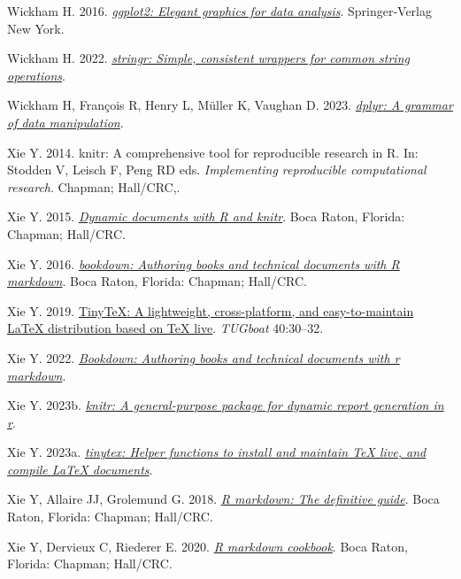 \documentclass[10pt,a4paper]{article}
\newlength{\cslhangindent}
\newenvironment{CSLReferences}[2] %
 {\begin{list}{}{%
  \setlength{\itemindent}{0pt}
  \setlength{\leftmargin}{0pt}
  \setlength{\parsep}{0pt}
  \ifodd #1
   \setlength{\leftmargin}{\cslhangindent}
   \setlength{\itemindent}{-1\cslhangindent}
  \fi
  \setlength{\itemsep}{#2\baselineskip}}}
 {\end{list}}
\begin{document}
\begin{CSLReferences}{1}{0}
Wickham H. 2016. \emph{\href{https://ggplot2.tidyverse.org}{ggplot2: Elegant graphics for data analysis}}. Springer-Verlag New York.

Wickham H. 2022. \emph{\href{https://CRAN.R-project.org/package=stringr}{{stringr}: Simple, consistent wrappers for common string operations}}.

Wickham H, François R, Henry L, Müller K, Vaughan D. 2023. \emph{\href{https://CRAN.R-project.org/package=dplyr}{{dplyr}: A grammar of data manipulation}}.

Xie Y. 2014. {knitr}: A comprehensive tool for reproducible research in {R}. In: Stodden V, Leisch F, Peng RD eds. \emph{Implementing reproducible computational research}. Chapman; Hall/CRC,.

Xie Y. 2015. \emph{\href{https://yihui.org/knitr/}{Dynamic documents with {R} and knitr}}. Boca Raton, Florida: Chapman; Hall/CRC.

Xie Y. 2016. \emph{\href{https://bookdown.org/yihui/bookdown}{{bookdown}: Authoring books and technical documents with {R} markdown}}. Boca Raton, Florida: Chapman; Hall/CRC.

Xie Y. 2019. \href{https://tug.org/TUGboat/Contents/contents40-1.html}{{TinyTeX}: A lightweight, cross-platform, and easy-to-maintain LaTeX distribution based on TeX live}. \emph{TUGboat} 40:30--32.

Xie Y. 2022. \emph{\href{https://CRAN.R-project.org/package=bookdown}{Bookdown: Authoring books and technical documents with r markdown}}.

Xie Y. 2023b. \emph{\href{https://yihui.org/knitr/}{{knitr}: A general-purpose package for dynamic report generation in r}}.

Xie Y. 2023a. \emph{\href{https://github.com/rstudio/tinytex}{{tinytex}: Helper functions to install and maintain TeX live, and compile LaTeX documents}}.

Xie Y, Allaire JJ, Grolemund G. 2018. \emph{\href{https://bookdown.org/yihui/rmarkdown}{R markdown: The definitive guide}}. Boca Raton, Florida: Chapman; Hall/CRC.

Xie Y, Dervieux C, Riederer E. 2020. \emph{\href{https://bookdown.org/yihui/rmarkdown-cookbook}{R markdown cookbook}}. Boca Raton, Florida: Chapman; Hall/CRC.

\end{CSLReferences}
\end{document}
